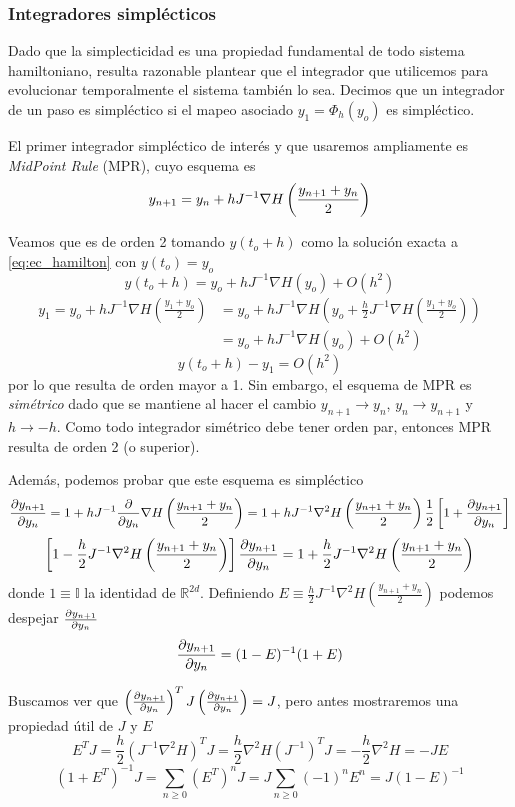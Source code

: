 \subsubsection{Integradores simplécticos}{\label{sec:int_simpl}}

Dado que la simplecticidad es una propiedad fundamental de todo sistema hamiltoniano, resulta razonable plantear que el integrador que utilicemos para evolucionar temporalmente
el sistema también lo sea.
Decimos que un integrador de un paso es simpléctico si el mapeo asociado $y_1=\Phi_h(y_o)$ es simpléctico.

El primer integrador simpléctico de interés y que usaremos ampliamente es \textit{MidPoint Rule} (MPR), cuyo esquema es
\begin{equation}{\label{eq:MPR}}
 y_{n+1} = y_n + hJ^{-1}\nabla H\left(\frac{y_{n+1}+y_n}{2}\right)
\end{equation}

Veamos que es de orden 2 tomando $y(t_o+h)$ como la solución exacta a \eqref{eq:ec_hamilton} con $y(t_o)=y_o$
\[ y(t_o+h) = y_o + hJ^{-1}\nabla H(y_o) + O(h^2) \]
\begin{align*}
y_1 = y_o + hJ^{-1}\nabla H\left(\frac{y_1+y_o}{2}\right) &=  y_o + hJ^{-1}\nabla H\left(y_o + \frac{h}{2}J^{-1}\nabla H\left(\frac{y_1+y_o}{2}\right)\right) \\
&= y_o + hJ^{-1}\nabla H(y_o) + O(h^2)
\end{align*}
\[ y(t_o+h) - y_1 = O(h^2) \]
por lo que resulta de orden mayor a 1.
Sin embargo, el esquema de MPR es \textit{simétrico} dado que se mantiene al hacer el cambio $y_{n+1}\to y_n$, $y_n\to y_{n+1}$ y $h\to -h$.
Como todo integrador simétrico debe tener orden par, entonces MPR resulta de orden 2 (o superior).

Además, podemos probar que este esquema es simpléctico
\[ \frac{\partial y_{n+1}}{\partial y_n} = 1 + hJ^{-1}\frac{\partial}{\partial y_n} \nabla H\left(\frac{y_{n+1}+y_n}{2}\right) = 1 + hJ^{-1} \nabla^2H\left(\frac{y_{n+1}+y_n}{2}\right)\frac{1}{2}\left[ 1+\frac{\partial y_{n+1}}{\partial y_n} \right]\]
\[ \left[ 1 - \frac{h}{2}J^{-1} \nabla^2H\left(\frac{y_{n+1}+y_n}{2}\right) \right]\frac{\partial y_{n+1}}{\partial y_n} =  1 + \frac{h}{2}J^{-1} \nabla^2H\left(\frac{y_{n+1}+y_n}{2}\right)\]
donde $1\equiv\mathbb{I}$ la identidad de $\mathbb{R}^{2d}$.
Definiendo $E\equiv\frac{h}{2}J^{-1} \nabla^2H\left(\frac{y_{n+1}+y_n}{2}\right)$ podemos despejar $\frac{\partial y_{n+1}}{\partial y_n}$
\[ \frac{\partial y_{n+1}}{\partial y_n} = (1-E)^{-1}(1+E) \]

Buscamos ver que $\left(\frac{\partial y_{n+1}}{\partial y_n}\right)^TJ\left(\frac{\partial y_{n+1}}{\partial y_n}\right)= J$, pero antes mostraremos una propiedad útil de $J$ y $E$
\[ E^T J = \frac{h}{2}\left( J^{-1} \nabla^2H \right)^T J = \frac{h}{2} \nabla^2H(J^{-1})^T  J = -\frac{h}{2} \nabla^2H = -JE\]
\[ (1 + E^T)^{-1}J = \sum_{n\geq0} \left(E^T\right)^n J = J\sum_{n\geq0} (-1)^nE^n = J(1 - E)^{-1}  \]

